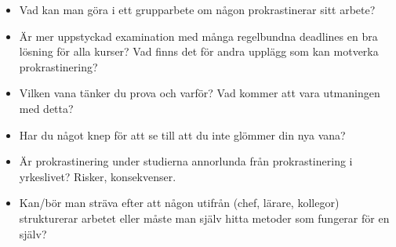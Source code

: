 \mode*

\begin{frame}
  \begin{question}
    \begin{itemize}
      \item Vad kan man göra i ett grupparbete om någon prokrastinerar sitt 
        arbete?
    \end{itemize}
  \end{question}
\end{frame}

\begin{frame}
  \begin{question}
    \begin{itemize}
      \item Är mer uppstyckad examination med många regelbundna deadlines en 
        bra lösning för alla kurser? Vad finns det för andra upplägg som kan 
        motverka prokrastinering?
    \end{itemize}
  \end{question}
\end{frame}

\begin{frame}
  \begin{question}
    \begin{itemize}
      \item Vilken vana tänker du prova och varför? Vad kommer att vara 
        utmaningen med detta?
      \item Har du något knep för att se till att du inte glömmer din nya vana?
    \end{itemize}
  \end{question}
\end{frame}

\begin{frame}
  \begin{question}
    \begin{itemize}
      \item Är prokrastinering under studierna annorlunda från prokrastinering 
        i yrkeslivet? Risker, konsekvenser.
    \end{itemize}
  \end{question}
\end{frame}

\begin{frame}
  \begin{question}
    \begin{itemize}
      \item Kan/bör man sträva efter att någon utifrån (chef, lärare, kollegor) 
        strukturerar arbetet eller måste man själv hitta metoder som fungerar 
        för en själv?
    \end{itemize}
  \end{question}
\end{frame}

